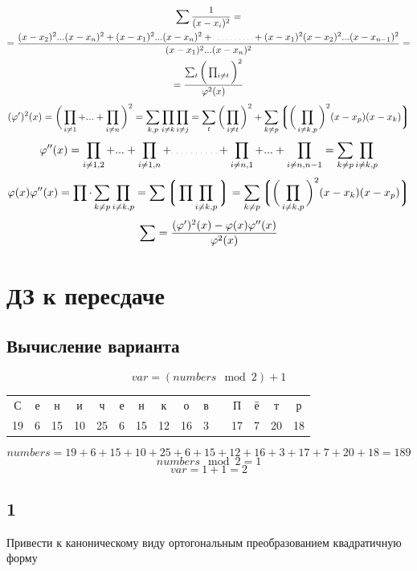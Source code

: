 \begin{multline*}
    \sum \frac1{(x - x_i)^2} = \\
    = \frac{(x - x_2)^2...(x - x_n)^2 + (x - x_1)^2...(x - x_n)^2 + \widedots[4em] + (x - x_1)^2(x - x_2)^2...(x - x_{n - 1})^2}{(x - x_1)^2...(x - x_n)^2} = \\
    = \frac{\sum_t \bigg( \prod_{i \ne t} \bigg)^2}{\vphi^2(x)}
\end{multline*}
$$ (\varphi')^2(x) = \bigg( \prod_{i \ne 1} + ... + \prod_{i \ne n} \bigg)^2 = \sum_{k, p} \prod_{i \ne k}\prod_{i \ne j} = \sum_t \bigg( \prod_{i \ne t} \bigg)^2 + \sum_{k \ne p} \bigg\lgroup \bigg(\prod_{i \ne k, p}\bigg)^2(x - x_p)(x - x_k) \bigg\rgroup $$
$$ \vphi''(x) = \prod_{i \ne 1, 2} + ... + \prod_{i \ne 1, n} + \widedots[4em] + \prod_{i \ne n, 1} + ... + \prod_{i \ne n, n - 1} = \sum_{k \ne p} \prod_{i \ne k, p} $$
$$ \varphi(x)\varphi''(x) = \prod \cdot \sum_{k \ne p} \prod_{i \ne k,p} = \sum \bigg\lgroup \prod \prod_{i \ne k, p} \bigg\rgroup = \sum_{k \ne p} \bigg\lgroup \bigg( \prod_{i \ne k, p} \bigg)^2 (x - x_k)(x - x_p) \bigg\rgroup $$
$$ \sum = \frac{(\varphi')^2(x) - \varphi(x)\varphi''(x)}{\varphi^2(x)} $$

\chapter{ДЗ к пересдаче}

\section{Вычисление варианта}

$$ var = (numbers \mod 2) + 1 $$

\begin{tabular}{c c c c c c c c c c c c c c c}
	С & е & н & и & ч & е & н & к & о & в & & П & ё & т & р \\
    19 & 6 & 15 & 10 & 25 & 6 & 15 & 12 & 16 & 3 & & 17 & 7 & 20 & 18
\end{tabular}

$$ numbers = 19 + 6 + 15 + 10 + 25 + 6 + 15 + 12 + 16 + 3 + 17 + 7 + 20 + 18 = 189 $$
$$ numbers \mod 2 = 1 $$
$$ var = 1 + 1 = 2 $$

\section{1}

Привести к каноническому виду ортогональным преобразованием квадратичную форму

